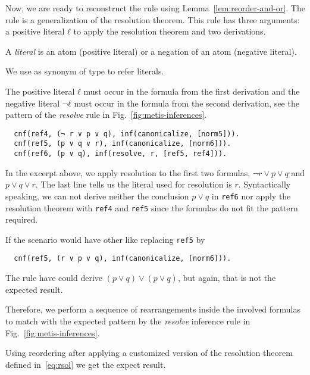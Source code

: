 \documentclass[../../main.tex]{subfiles}
\begin{document}
Now, we are ready to reconstruct the \resolve rule using
Lemma~\ref{lem:reorder-and-or}.
The \resolve rule is a generalization of the resolution theorem.
This rule has three arguments: a positive literal $ℓ$ to apply the
resolution theorem and two derivations.

\begin{mydefinition}
A \emph{literal} is an atom (positive literal) or a negation
of an atom (negative literal).
\end{mydefinition}

\begin{notation}
We use \Lit as synonym of \Prop type to refer literals.
\end{notation}

The positive literal $ℓ$ must occur in
the formula from the first derivation and the
negative literal $¬ ℓ$ must occur in the formula from the second derivation,
see the pattern of the \emph{resolve} rule in Fig.~\ref{fig:metis-inferences}.

\begin{myexamplenum}\hspace{10cm}
\label{ex:resolve-tstp}
\begin{verbatim}
  cnf(ref4, (¬ r ∨ p ∨ q), inf(canonicalize, [norm5])).
  cnf(ref5, (p ∨ q ∨ r), inf(canonicalize, [norm6])).
  cnf(ref6, (p ∨ q), inf(resolve, r, [ref5, ref4])).
\end{verbatim}
In the excerpt above, we apply resolution to the first two formulas,
$¬ r ∨ p ∨ q$ and $p ∨ q ∨ r$. The last line tells us the literal used
for resolution is $r$. Syntactically speaking,
we can not derive neither the conclusion $p ∨ q$ in \verb!ref6! nor apply the resolution theorem with \verb!ref4! and \verb!ref5! since the formulas do not fit the pattern required.

If the scenario would have other like replacing \verb!ref5! by
\begin{verbatim}
  cnf(ref5, (r ∨ p ∨ q), inf(canonicalize, [norm6])).
\end{verbatim}
The \resolve rule have could derive $(p ∨ q) ∨ (p ∨ q)$, but again, that is not the expected result.
\end{myexamplenum}

Therefore, we perform a sequence of rearrangements inside the
involved formulas to match with the expected pattern by the
\emph{resolve} inference rule in Fig.~\ref{fig:metis-inferences}.

Using reordering after
applying a customized version of the resolution theorem defined
in~\eqref{eq:rsol} we get the expect result.
\end{document}
